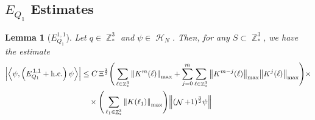 \documentclass[sn-mathphys, Numbered ,a4paper]{sn-jnl}%
\DeclareMathOperator{\Z}{\mathbb{Z}}
\DeclareMathOperator{\HH}{\mathcal{H}}
\DeclareMathOperator{\NN}{\mathcal{N}}
\newcommand{\half}{\frac{1}{2}}
\newcommand{\eva}[1]{\left\langle #1 \right\rangle}
\theoremstyle{plain}
\newtheorem{lemma}[theorem]{Lemma}
\theoremstyle{definition}
\theoremstyle{remark}
\theoremstyle{plain}
\theoremstyle{definition}
\theoremstyle{remark}
\begin{document}
 \subsection{$E_{Q_1}$ Estimates}
\begin{lemma}[$E_{Q_1}^{1,1}$]
Let $q \in \Z^3_*$ and $\psi \in \HH_N$. Then, for any $ S \subset \Z^3_* $, we have the estimate
\begin{align}
     \abs{\eva{\psi,\left(E^{\,1,1}_{Q_1}+\mathrm{h.c.}\right) \psi }}\nonumber
     &\leq  C\, \Xi^{\half} \Bigg(\sum\limits_{\ell \in \Z^3_*} \norm{K^m(\ell)}_{\mathrm{max}} + \sum\limits_{j=0}^m \sum\limits_{\ell \in \Z^3_*}\norm{K^{m-j}(\ell)}_{\mathrm{max}}\norm{K^{j}(\ell)}_{\mathrm{max}}\Bigg)\times\\&\quad\times \Bigg( \sum\limits_{\ell_1 \in \Z^3_*}\norm{K(\ell_1)}_{\mathrm{max}} \Bigg)  \norm { (\NN+1)^{\frac{3}{2}} \psi } \label{eq:estEQ111}
\end{align}
\end{lemma}
\end{document}

